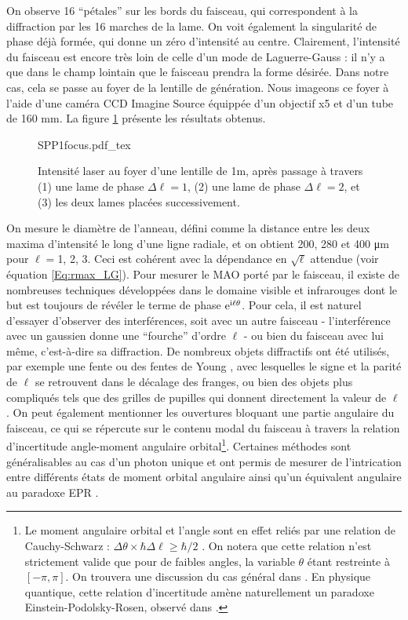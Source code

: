 On observe 16 ``pétales'' sur les bords du faisceau, qui correspondent à la diffraction par les 16 marches de la lame. On voit également la singularité de phase déjà formée, qui donne un zéro d'intensité au centre. Clairement, l'intensité du faisceau est encore très loin de celle d'un mode de Laguerre-Gauss : il n'y a que dans le champ lointain que le faisceau prendra la forme désirée. Dans notre cas, cela se passe au foyer de la lentille de génération. Nous imageons ce foyer à l'aide d'une caméra CCD Imagine Source équippée d'un objectif x5 et d'un tube de 160 mm. La figure \ref{Fig:LGFocus} présente les résultats obtenus.\par
\begin{figure}[!ht]
\centering
\def\svgwidth{0.8\columnwidth}
{SPP1focus.pdf_tex}
\caption{Intensité laser au foyer d'une lentille de 1m, après passage à travers (1) une lame de phase $\Delta\ell = 1$, (2) une lame de phase $\Delta\ell = 2$, et (3) les deux lames placées successivement.}
\label{Fig:LGFocus}
\end{figure}
On mesure le diamètre de l'anneau, défini comme la distance entre les deux maxima d'intensité le long d'une ligne radiale, et on obtient 200, 280 et 400 \si{\um} pour $\ell=$1, 2, 3. Ceci est cohérent avec la dépendance en $\sqrt{\ell}$ attendue (voir équation \ref{Eq:rmax_LG}). Pour mesurer le MAO porté par le faisceau, il existe de nombreuses techniques développées dans le domaine visible et infrarouges dont le but est toujours de révéler le terme de phase $\mathrm{e}^{\mathrm{i}\ell\theta}$. Pour cela, il est naturel d'essayer d'observer des interférences, soit avec un autre faisceau - l'interférence avec un gaussien donne une ``fourche'' d'ordre $\ell$  - ou bien du faisceau avec lui même, c'est-à-dire sa diffraction. De nombreux objets diffractifs ont été utilisés, par exemple une fente  ou des fentes de Young , avec lesquelles le signe et la parité de $\ell$ se retrouvent dans le décalage des franges, ou bien des objets plus compliqués tels que des grilles de pupilles  qui donnent directement la valeur de $\ell$. On peut également mentionner les ouvertures bloquant une partie angulaire du faisceau, ce qui se répercute sur le contenu modal du faisceau à travers la relation d'incertitude angle-moment angulaire orbital\label{footnote:angle_oam}\footnote{Le moment angulaire orbital et l'angle sont en effet reliés par une relation de Cauchy-Schwarz : 	$\Delta\theta\times\hbar\Delta\ell \geq \hbar/2$ . On notera que cette relation n'est strictement valide que pour de faibles angles, la variable $\theta$ étant restreinte à $[-\pi,\pi]$. On trouvera une discussion du cas général dans . En physique quantique, cette relation d'incertitude amène naturellement un paradoxe Einstein-Podolsky-Rosen, observé dans .}. Certaines méthodes sont généralisables au cas d'un photon unique et ont permis de mesurer de l'intrication entre différents états de moment orbital angulaire  ainsi qu'un équivalent angulaire au paradoxe EPR . \par 
